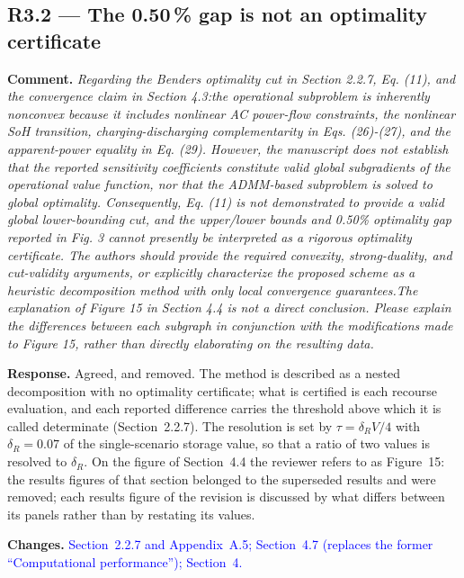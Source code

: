 \documentclass[11pt]{article}
\newcommand{\rcomment}[1]{\par\medskip\noindent\textbf{Comment.} \textit{#1}\par\smallskip}
\newcommand{\rresponse}[1]{\noindent\textbf{Response.} #1\par\smallskip}
\newcommand{\rchanges}[1]{\noindent\textbf{Changes.} \textcolor{blue}{#1}\par\medskip}
\begin{document}
\subsection*{R3.2 --- The 0.50\,\% gap is not an optimality certificate}
\rcomment{
Regarding the Benders optimality cut in Section 2.2.7, Eq. (11), and the convergence claim in Section 4.3:the operational subproblem is inherently nonconvex because it includes nonlinear AC power-flow constraints, the nonlinear SoH transition, charging-discharging complementarity in Eqs. (26)-(27), and the apparent-power equality in Eq. (29). However, the manuscript does not establish that the reported sensitivity coefficients constitute valid global subgradients of the operational value function, nor that the ADMM-based subproblem is solved to global optimality. Consequently, Eq. (11) is not demonstrated to provide a valid global lower-bounding cut, and the upper/lower bounds and 0.50\% optimality gap reported in Fig. 3 cannot presently be interpreted as a rigorous optimality certificate. The authors should provide the required convexity, strong-duality, and cut-validity arguments, or explicitly characterize the proposed scheme as a heuristic decomposition method with only local convergence guarantees.The explanation of Figure 15 in Section 4.4 is not a direct conclusion. Please explain the differences between each subgraph in conjunction with the modifications made to Figure 15, rather than directly elaborating on the resulting data.
}
\rresponse{Agreed, and removed. The method is described as a nested decomposition with no optimality
certificate; what is certified is each recourse evaluation, and each reported difference carries the
threshold above which it is called determinate (Section~2.2.7). The resolution is set by
$\tau = \delta_R V/4$ with $\delta_R = 0.07$ of the single-scenario storage value, so that a ratio of
two values is resolved to $\delta_R$. On the figure of Section~4.4 the reviewer refers to as Figure~15: the results figures of that section
belonged to the superseded results and were removed; each results figure of the revision is discussed by
what differs between its panels rather than by restating its values.}
\rchanges{Section~2.2.7 and Appendix~A.5; Section~4.7 (replaces the former ``Computational performance''); Section~4.}
\end{document}
